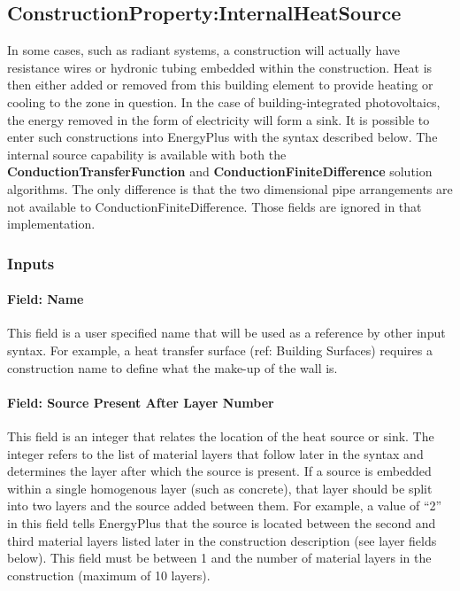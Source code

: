 \subsection{ConstructionProperty:InternalHeatSource}\label{constructioninternalsource}

In some cases, such as radiant systems, a construction will actually have
resistance wires or hydronic tubing embedded within the construction. Heat is
then either added or removed from this building element to provide heating or
cooling to the zone in question. In the case of building-integrated
photovoltaics, the energy removed in the form of electricity will form a sink.
It is possible to enter such constructions into EnergyPlus with the syntax
described below. The internal source capability is available with both the
\textbf{ConductionTransferFunction} and \textbf{ConductionFiniteDifference}
solution algorithms. The only difference is that the two dimensional pipe
arrangements are not available to ConductionFiniteDifference. Those fields are
ignored in that implementation.

\subsubsection{Inputs}\label{inputs-38}

\paragraph{Field: Name}\label{field-name-31-000}

This field is a user specified name that will be used as a reference by other input syntax. For example, a heat transfer surface (ref: Building Surfaces) requires a construction name to define what the make-up of the wall is.

\paragraph{Field: Source Present After Layer Number}\label{field-source-present-after-layer-number}

This field is an integer that relates the location of the heat source or sink. The integer refers to the list of material layers that follow later in the syntax and determines the layer after which the source is present. If a source is embedded within a single homogenous layer (such as concrete), that layer should be split into two layers and the source added between them. For example, a value of ``2'' in this field tells EnergyPlus that the source is located between the second and third material layers listed later in the construction description (see layer fields below). This field must be between 1 and the number of material layers in the construction (maximum of 10 layers).

